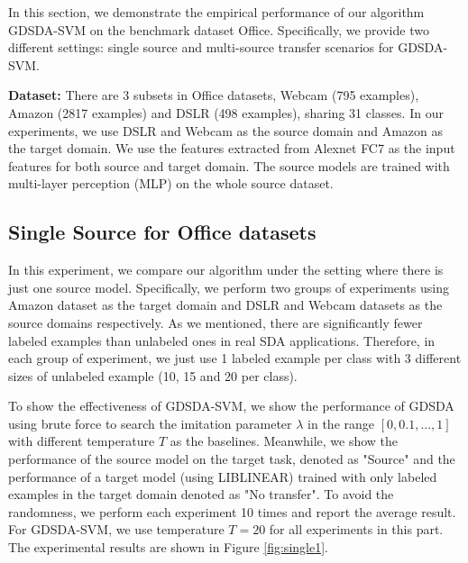 In this section, we demonstrate the empirical performance of our algorithm GDSDA-SVM on the benchmark dataset Office. Specifically, we provide two different settings: single source and multi-source transfer scenarios for GDSDA-SVM.

\textbf{Dataset:}
There are 3 subsets in Office datasets, Webcam (795 examples), Amazon (2817 examples) and DSLR (498 examples), sharing 31 classes. In our experiments, we use DSLR and Webcam as the source domain and Amazon as the target domain.
We use the features extracted from Alexnet \cite{KrizhevskyNIPS12} FC7 as the input features for both source and target domain. The source models are trained with multi-layer perception (MLP) on the whole source dataset. 

\subsection{Single Source for Office datasets}
In this experiment, we compare our algorithm under the setting where there is just one source model. Specifically, we perform two groups of experiments using Amazon dataset as the target domain and DSLR and Webcam datasets as the source domains respectively. As we mentioned, there are significantly fewer labeled examples than unlabeled ones in real SDA applications.
Therefore, in each group of experiment, we just use 1 labeled example per class with 3 different sizes of unlabeled example (10, 15 and 20 per class).

To show the effectiveness of GDSDA-SVM, we show the performance of GDSDA using brute force to search the imitation parameter $\lambda$ in the range $[0,0.1,...,1]$ with different temperature $T$ as the baselines. Meanwhile, we show the performance of the source model on the target task, denoted as "Source" and the performance of a target model (using LIBLINEAR\cite{fan2008liblinear}) trained with only labeled examples in the target domain denoted as "No transfer". To avoid the randomness, we perform each experiment 10 times and report the average result. For GDSDA-SVM, we use temperature $T=20$ for all experiments in this part. The experimental results are shown in Figure \ref{fig:single1}. 

